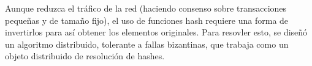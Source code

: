 Aunque reduzca el tráfico de la red (haciendo consenso sobre transacciones pequeñas
y de tamaño fijo), el uso de funciones hash requiere una forma de
invertirlos para así obtener los elementos originales.
Para resovler esto, se diseñó
un algoritmo distribuido, tolerante a fallas bizantinas, que trabaja como un objeto
distribuido de resolución de hashes.




